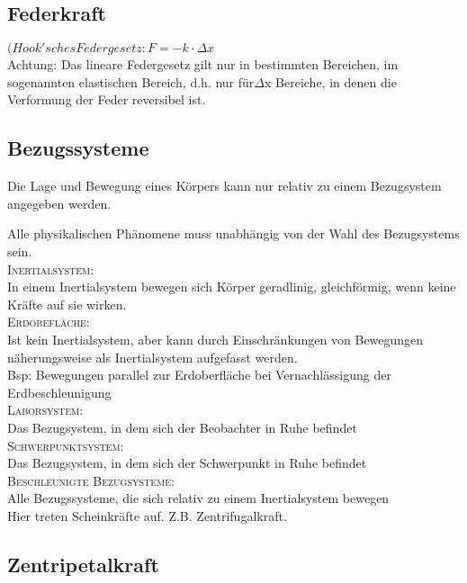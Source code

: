 \documentclass[a4paper,12pt]{report}
\begin{document}
\subsection{Federkraft}

$(Hook'sches Federgesetz: F =- k \cdot \Delta x $   \\

Achtung: Das lineare Federgesetz gilt nur in bestimmten Bereichen, im sogenannten elastischen Bereich, d.h. nur für$\Delta$x Bereiche, in denen die Verformung der Feder reversibel ist. \\

\subsection{Bezugssysteme}

Die Lage und Bewegung eines Körpers kann nur relativ zu einem Bezugsystem angegeben werden.

Alle physikalischen Phänomene muss unabhängig von der Wahl des Bezugsystems sein. \\


\textsc{Inertialsystem:} \\
In einem Inertialsystem bewegen sich Körper geradlinig, gleichförmig, wenn keine Kräfte auf sie wirken. \\

\textsc{Erdobefläche:} \\
 Ist kein Inertialsystem, aber kann durch Einschränkungen von Bewegungen näherungsweise als Inertialsystem aufgefasst werden.\\
		Bsp: Bewegungen parallel zur Erdoberfläche bei Vernachlässigung der Erdbeschleunigung\\
	
\textsc{Laborsystem:}\\
Das Bezugsystem, in dem sich der Beobachter in Ruhe befindet\\

\textsc{Schwerpunktsystem:}\\
Das Bezugsystem, in dem sich der Schwerpunkt in Ruhe befindet\\

\textsc{Beschleunigte Bezugsysteme:}\\
Alle Bezugssysteme, die sich relativ zu einem Inertialsystem bewegen\\
Hier treten Scheinkräfte auf. Z.B. Zentrifugalkraft.\\

\subsection{Zentripetalkraft}
\end{document}
